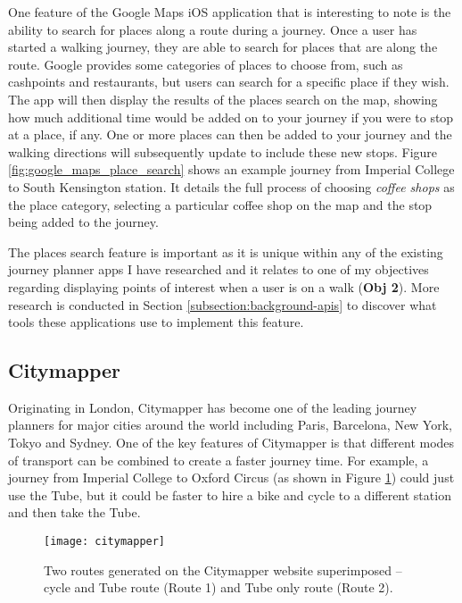 One feature of the Google Maps iOS application that is interesting to note is the ability to search for places along a route during a journey. Once a user has started a walking journey, they are able to search for places that are along the route. Google provides some categories of places to choose from, such as cashpoints and restaurants, but users can search for a specific place if they wish. The app will then display the results of the places search on the map, showing how much additional time would be added on to your journey if you were to stop at a place, if any. One or more places can then be added to your journey and the walking directions will subsequently update to include these new stops. Figure \ref{fig:google_maps_place_search} shows an example journey from Imperial College to South Kensington station. It details the full process of choosing \textit{coffee shops} as the place category, selecting a particular coffee shop on the map and the stop being added to the journey.

The places search feature is important as it is unique within any of the existing journey planner apps I have researched and it relates to one of my objectives regarding displaying points of interest when a user is on a walk (\textbf{Obj 2}). More research is conducted in Section \ref{subsection:background-apis} to discover what tools these applications use to implement this feature.

\subsection{Citymapper}

Originating in London, Citymapper \cite{Citymapper} has become one of the leading journey planners for major cities around the world including Paris, Barcelona, New York, Tokyo and Sydney. One of the key features of Citymapper is that different modes of transport can be combined to create a faster journey time. For example, a journey from Imperial College to Oxford Circus (as shown in Figure \ref{fig:citymapper}) could just use the Tube, but it could be faster to hire a bike and cycle to a different station and then take the Tube.

\begin{figure}[hbt]
  \centering
  \texttt{[image: citymapper]}
  \caption{Two routes generated on the Citymapper website superimposed -- cycle and Tube route (Route 1) and Tube only route (Route 2).}
  \label{fig:citymapper}
\end{figure}

